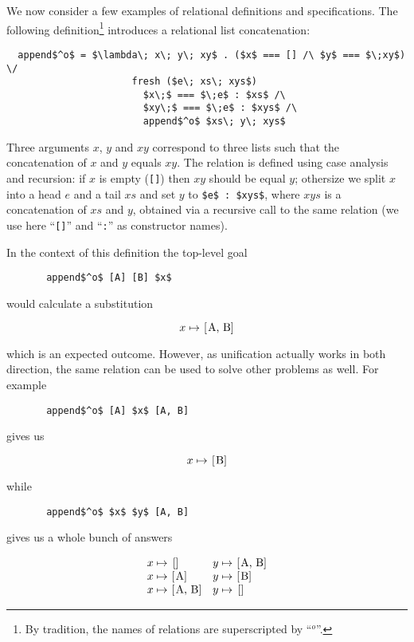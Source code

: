 We now consider a few examples of relational definitions and specifications. The following definition\footnote{By tradition, the names of relations are superscripted by ``$^o$''.}
introduces a relational list concatenation:

\begin{lstlisting}
  append$^o$ = $\lambda\; x\; y\; xy$ . ($x$ === [] /\ $y$ === $\;xy$) \/
                      fresh ($e\; xs\; xys$) 
                        $x\;$ === $\;e$ : $xs$ /\ 
                        $xy\;$ === $\;e$ : $xys$ /\ 
                        append$^o$ $xs\; y\; xys$
\end{lstlisting}

Three arguments $x$, $y$ and $xy$ correspond to three lists such that the concatenation of $x$ and $y$ equals $xy$. The relation is defined using case analysis and recursion: if
$x$ is empty (\lstinline|[]|) then $xy$ should be equal $y$; othersize we split $x$ into a head $e$ and a tail $xs$ and set $y$ to \lstinline|$e$ : $xys$|, where
$xys$ is a concatenation of $xs$ and $y$, obtained via a recursive call to the same relation (we use here ``\lstinline|[]|'' and ``\lstinline|:|'' as constructor names).

In the context of this definition the top-level goal

\begin{lstlisting}
       append$^o$ [A] [B] $x$
\end{lstlisting}

would calculate a substitution

\[
x \mapsto \mbox{\lstinline|[A, B]|}
\]

which is an expected outcome. However, as unification actually works in both direction, the same relation can be used to solve other problems as well. For example

\begin{lstlisting}
       append$^o$ [A] $x$ [A, B]
\end{lstlisting}

gives us

\[
x \mapsto \mbox{\lstinline|[B]|}
\]

while

\begin{lstlisting}
       append$^o$ $x$ $y$ [A, B]
\end{lstlisting}

gives us a whole bunch of answers

\[
\begin{array}{ll}
  x \mapsto \mbox{\lstinline|[]|} & y \mapsto \mbox{\lstinline|[A, B]|} \\
  x \mapsto \mbox{\lstinline|[A]|} & y \mapsto \mbox{\lstinline|[B]|} \\
  x \mapsto \mbox{\lstinline|[A, B]|} & y \mapsto \mbox{\lstinline|[]|} 
\end{array}
\]

